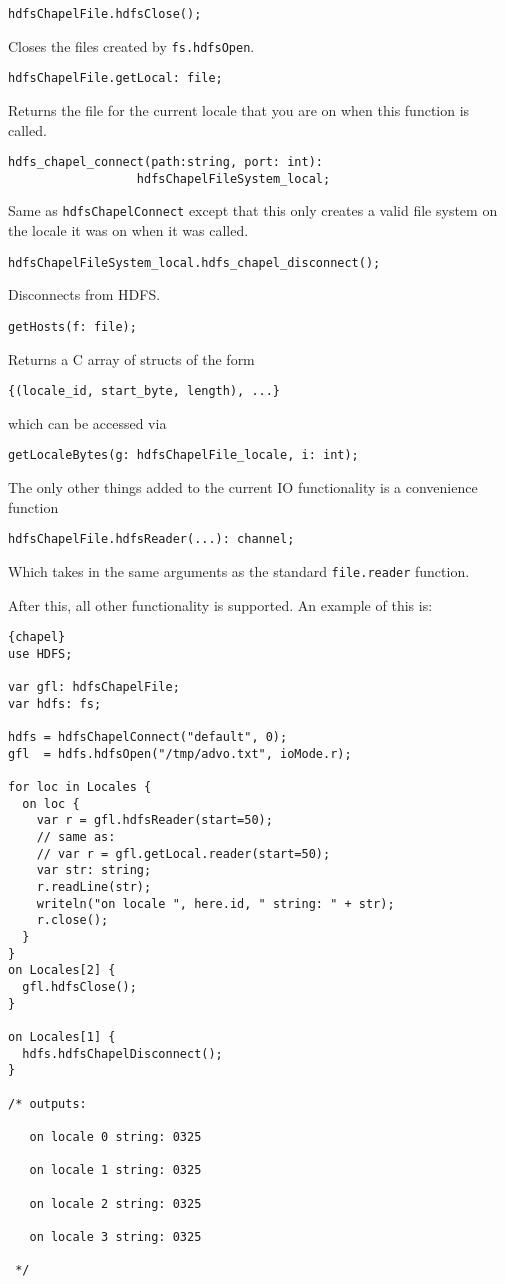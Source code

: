 \begin{lstlisting}
hdfsChapelFile.hdfsClose();
\end{lstlisting}
Closes the files created by {\tt fs.hdfsOpen}.

\begin{lstlisting}
hdfsChapelFile.getLocal: file;
\end{lstlisting}
Returns the file for the current locale that you are on when this function is called.

\begin{lstlisting}
hdfs_chapel_connect(path:string, port: int): 
                  hdfsChapelFileSystem_local;
\end{lstlisting}
Same as {\tt hdfsChapelConnect} except that this only creates a valid file system on the
locale it was on when it was called.

\begin{lstlisting}
hdfsChapelFileSystem_local.hdfs_chapel_disconnect();
\end{lstlisting}
Disconnects from HDFS.

\begin{lstlisting}
getHosts(f: file);
\end{lstlisting}
Returns a C array of structs of the form 
\begin{lstlisting}
{(locale_id, start_byte, length), ...}
\end{lstlisting}
which can be accessed via 
\begin{lstlisting}
getLocaleBytes(g: hdfsChapelFile_locale, i: int);
\end{lstlisting}
The only other things added to the current IO functionality is a convenience function
\begin{lstlisting}
hdfsChapelFile.hdfsReader(...): channel;
\end{lstlisting}
Which takes in the same arguments as the standard {\tt file.reader} function.

After this, all other functionality is supported. An example of this is:
\begin{lstlisting}{chapel}
use HDFS;

var gfl: hdfsChapelFile;
var hdfs: fs;

hdfs = hdfsChapelConnect("default", 0);
gfl  = hdfs.hdfsOpen("/tmp/advo.txt", ioMode.r);

for loc in Locales {
  on loc {
    var r = gfl.hdfsReader(start=50);
    // same as:
    // var r = gfl.getLocal.reader(start=50);
    var str: string;
    r.readLine(str);
    writeln("on locale ", here.id, " string: " + str);
    r.close();
  }
}
on Locales[2] {
  gfl.hdfsClose();
}

on Locales[1] {
  hdfs.hdfsChapelDisconnect();
}

/* outputs:

   on locale 0 string: 0325

   on locale 1 string: 0325

   on locale 2 string: 0325

   on locale 3 string: 0325

 */
\end{lstlisting}

